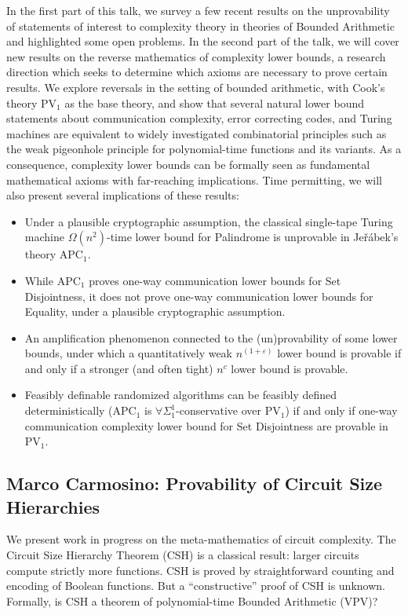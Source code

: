 \documentclass[11pt]{article}
\begin{document}
In the first part of this talk, we survey a few recent results on the unprovability of statements of interest to complexity theory in theories of Bounded Arithmetic and highlighted some open problems. In the second part of the talk, we will cover new results on the reverse mathematics of complexity lower bounds, a research direction which seeks to determine which axioms are necessary to prove certain results. We explore reversals in the setting of bounded arithmetic, with Cook's theory $\mathrm{PV}_1$ as the base theory, and show that several natural lower bound statements about communication complexity, error correcting codes, and Turing machines are equivalent to widely investigated combinatorial principles such as the weak pigeonhole principle for polynomial-time functions and its variants. As a consequence, complexity lower bounds can be formally seen as fundamental mathematical axioms with far-reaching implications. Time permitting, we will also present several implications of these results: 

\begin{itemize}
\item Under a plausible cryptographic assumption, the classical single-tape Turing machine $\Omega(n^2)$-time lower bound for Palindrome is unprovable in Je\v{r}\'{a}bek's theory $\mathrm{APC}_1$.
\item While $\mathrm{APC}_1$ proves one-way communication lower bounds for Set Disjointness, it does not prove one-way communication lower bounds for Equality, under a plausible cryptographic assumption.
\item An amplification phenomenon connected to the (un)provability of some lower bounds, under which a quantitatively weak $n^(1 + \varepsilon)$ lower bound is provable if and only if a stronger (and often tight) $n^c$ lower bound is provable.
\item Feasibly definable randomized algorithms can be feasibly defined deterministically ($\mathrm{APC}_1$ is $\forall\Sigma_1^1$-conservative over $\mathrm{PV}_1$) if and only if one-way communication complexity lower bound for Set Disjointness are provable in $\mathrm{PV}_1$.
\end{itemize}


\subsection*{Marco Carmosino: Provability of Circuit Size Hierarchies}\label{Carmosino}

We present work in progress on the meta-mathematics of circuit complexity.  The Circuit Size Hierarchy Theorem (CSH) is a classical result: larger circuits compute strictly more functions.  CSH is proved by straightforward counting and encoding of Boolean functions.  But a ``constructive'' proof of CSH is unknown.  Formally, is CSH a theorem of polynomial-time Bounded Arithmetic (VPV)?
 
\end{document}
